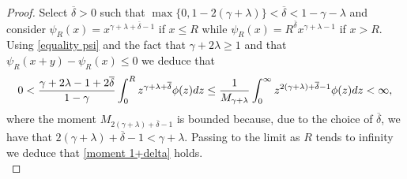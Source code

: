 \documentclass[11pt]{article}
\numberwithin{equation}{section}
\theoremstyle{plain}
\newcommand{\der}{\textup{d}}
\begin{document}
\begin{proof}
Select $\overline \delta >0$ such that 
$\max\{0, 1- 2 (\gamma+\lambda)\} < \overline \delta  < 1-\gamma - \lambda $ and consider $\psi_R(x)=x^{\gamma+\lambda + \overline \delta -1 }$ if $x \leq R$ while $\psi_R(x)=R^{\overline \delta} x^{\gamma+\lambda  -1 }$ if $x > R$. 
Using \eqref{equality psi} and the fact that $\gamma+ 2\lambda \geq 1 $ and that $\psi_R(x+y)-\psi_R(x) \leq 0$ we deduce that 
\begin{align*}
0< \frac{\gamma + 2\lambda -1 +2\overline \delta } {1-\gamma } \int_0^R z^{\gamma + \lambda + \overline \delta }  \phi(z) \der z \leq \frac{1}{M_{\gamma+\lambda} } \int_0^\infty z^{2(\gamma+\lambda)+ \overline \delta -1 } \phi(z) \der z < \infty,
\end{align*} 
where the moment $M_{2(\gamma+\lambda)+ \overline \delta -1 }$ is bounded because, due to the choice of $\overline \delta$, we have that $2(\gamma +\lambda ) + \overline \delta -1 < \gamma +\lambda $.
Passing to the limit as $R$ tends to infinity we deduce that \eqref{moment 1+delta} holds. \\
	

\end{proof}
\end{document}
